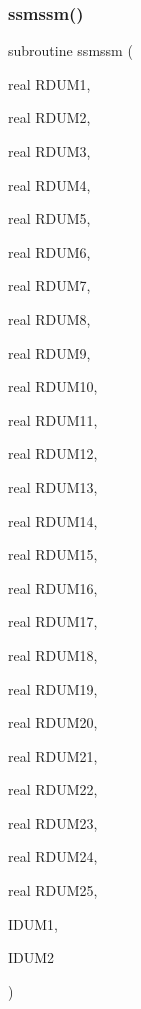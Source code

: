 \subsubsection{\texorpdfstring{ssmssm()}{ssmssm()}}
{\footnotesize\ttfamily subroutine ssmssm (\begin{DoxyParamCaption}\item[{real}]{R\+D\+U\+M1,  }\item[{real}]{R\+D\+U\+M2,  }\item[{real}]{R\+D\+U\+M3,  }\item[{real}]{R\+D\+U\+M4,  }\item[{real}]{R\+D\+U\+M5,  }\item[{real}]{R\+D\+U\+M6,  }\item[{real}]{R\+D\+U\+M7,  }\item[{real}]{R\+D\+U\+M8,  }\item[{real}]{R\+D\+U\+M9,  }\item[{real}]{R\+D\+U\+M10,  }\item[{real}]{R\+D\+U\+M11,  }\item[{real}]{R\+D\+U\+M12,  }\item[{real}]{R\+D\+U\+M13,  }\item[{real}]{R\+D\+U\+M14,  }\item[{real}]{R\+D\+U\+M15,  }\item[{real}]{R\+D\+U\+M16,  }\item[{real}]{R\+D\+U\+M17,  }\item[{real}]{R\+D\+U\+M18,  }\item[{real}]{R\+D\+U\+M19,  }\item[{real}]{R\+D\+U\+M20,  }\item[{real}]{R\+D\+U\+M21,  }\item[{real}]{R\+D\+U\+M22,  }\item[{real}]{R\+D\+U\+M23,  }\item[{real}]{R\+D\+U\+M24,  }\item[{real}]{R\+D\+U\+M25,  }\item[{}]{I\+D\+U\+M1,  }\item[{}]{I\+D\+U\+M2 }\end{DoxyParamCaption})}

\mbox{\label{pythia-6_84_824_8f_a0a9ab2acbdfa0c53863d0570d5c8195e}} 
